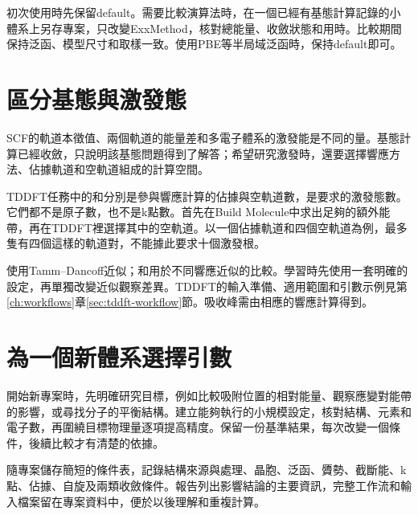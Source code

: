 初次使用時先保留default。需要比較演算法時，在一個已經有基態計算記錄的小體系上另存專案，只改變ExxMethod，核對總能量、收斂狀態和用時。比較期間保持泛函、模型尺寸和取樣一致。使用PBE等半局域泛函時，保持default即可。

\section{區分基態與激發態}

SCF的軌道本徵值、兩個軌道的能量差和多電子體系的激發能是不同的量。基態計算已經收斂，只說明該基態問題得到了解答；希望研究激發時，還要選擇響應方法、佔據軌道和空軌道組成的計算空間。

TDDFT任務中的和分別是參與響應計算的佔據與空軌道數，是要求的激發態數。它們都不是原子數，也不是k點數。首先在Build Molecule中求出足夠的額外能帶，再在TDDFT裡選擇其中的空軌道。以一個佔據軌道和四個空軌道為例，最多隻有四個這樣的軌道對，不能據此要求十個激發根。

使用Tamm--Dancoff近似；和用於不同響應近似的比較。學習時先使用一套明確的設定，再單獨改變近似觀察差異。TDDFT的輸入準備、適用範圍和引數示例見第\ref{ch:workflows}章\ref{sec:tddft-workflow}節。吸收峰需由相應的響應計算得到。


\section{為一個新體系選擇引數}

開始新專案時，先明確研究目標，例如比較吸附位置的相對能量、觀察應變對能帶的影響，或尋找分子的平衡結構。建立能夠執行的小規模設定，核對結構、元素和電子數，再圍繞目標物理量逐項提高精度。保留一份基準結果，每次改變一個條件，後續比較才有清楚的依據。

隨專案儲存簡短的條件表，記錄結構來源與處理、晶胞、泛函、贗勢、截斷能、k點、佔據、自旋及兩類收斂條件。報告列出影響結論的主要資訊，完整工作流和輸入檔案留在專案資料中，便於以後理解和重複計算。
